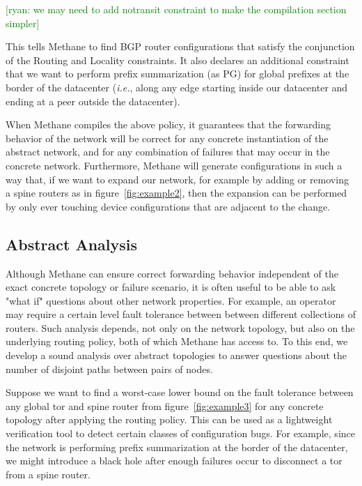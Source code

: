 \documentclass{sig-alternate-10pt}
\newcommand{\ryan}[1]{\textcolor{green}{[ryan: #1]}}
\newcommand{\IE}{\emph{i.e.}}
\newcommand{\sysname}{{\small \sf Methane}\xspace}
\begin{document}
\ryan{we may need to add notransit constraint to make the compilation section simpler}

This tells \sysname to find BGP router configurations that satisfy the conjunction of the Routing and Locality constraints. It also declares an additional constraint that we want to perform prefix summarization (as PG) for global prefixes at the border of the datacenter (\IE, along any edge starting inside our datacenter and ending at a peer outside the datacenter).

When \sysname compiles the above policy, it guarantees that the forwarding behavior of the network will be correct for any concrete instantiation of the abstract network, and for any combination of failures that may occur in the concrete network. Furthermore, \sysname will generate configurations in such a way that, if we want to expand our network, for example by adding or removing a spine routers as in figure~\ref{fig:example2}, then the expansion can be performed by only ever touching device configurations that are adjacent to the change.

\subsection{Abstract Analysis}

Although \sysname can ensure correct forwarding behavior independent of the exact concrete topology or failure scenario, it is often useful to be able to ask "what if" questions about other network properties. For example, an operator may require a certain level fault tolerance between between different collections of routers. Such analysis depends, not only on the network topology, but also on the underlying routing policy, both of which \sysname has access to. To this end, we develop a sound analysis over abstract topologies to answer questions about the number of disjoint paths between pairs of nodes.

Suppose we want to find a worst-case lower bound on the fault tolerance between any global tor and spine router from figure~\ref{fig:example3} for any concrete topology after applying the routing policy. This can be used as a lightweight verification tool to detect certain classes of configuration bugs. For example, since the network is performing prefix summarization at the border of the datacenter, we might introduce a black hole after enough failures occur to disconnect a tor from a spine router.
\end{document}

